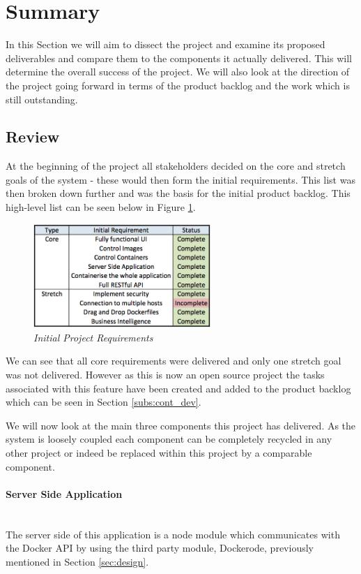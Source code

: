 \section{Summary}
\label{sec:summary}
In this Section we will aim to dissect the project and examine its proposed deliverables and compare them to the components it actually delivered. This will determine the overall success of the project. We will also look at the direction of the project going forward in terms of the product backlog and the work which is still outstanding.

\subsection{Review}
At the beginning of the project all stakeholders decided on the core and stretch goals of the system - these would then form the initial requirements. This list was then broken down further and was the basis for the initial product backlog. This high-level list can be seen below in Figure \ref{fig:requirements}.

\begin{figure}[!ht]
\centering
\includegraphics*[width=0.6\textwidth]{images/requirements}
\caption{\em Initial Project Requirements}
\label{fig:requirements}
\end{figure}

We can see that all core requirements were delivered and only one stretch goal was not delivered. However as this is now an open source project the tasks associated with this feature have been created and added to the product backlog which can be seen in Section \ref{subs:cont_dev}.

We will now look at the main three components this project has delivered. As the system is loosely coupled each component can be completely recycled in any other project or indeed be replaced within this project by a comparable component.

\paragraph{Server Side Application}\mbox{}\\
The server side of this application is a node module which communicates with the Docker API by using the third party module, Dockerode, previously mentioned in Section \ref{sec:design}.

